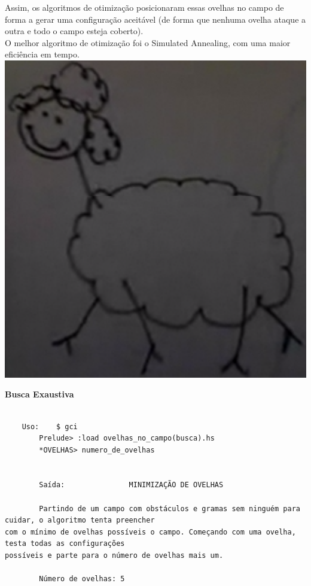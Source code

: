 \documentclass[10pt]{article}
\begin{document}
Assim, os algoritmos de otimização posicionaram essas ovelhas no campo de forma a gerar uma configuração aceitável (de forma que nenhuma ovelha ataque a outra e todo o campo esteja coberto). \\

O melhor algoritmo de otimização foi o Simulated Annealing, com uma maior eficiência em tempo. \\

\vspace{20mm}
\centering
\includegraphics[scale = .5]{ovelha.png}

\pagebreak

\textbf{Busca Exaustiva}
\begin{verbatim}

	Uso:	$ gci
		Prelude> :load ovelhas_no_campo(busca).hs
		*OVELHAS> numero_de_ovelhas

 
        Saída:			     MINIMIZAÇÃO DE OVELHAS

		Partindo de um campo com obstáculos e gramas sem ninguém para cuidar, o algoritmo tenta preencher
com o mínimo de ovelhas possíveis o campo. Começando com uma ovelha, testa todas as configurações 
possíveis e parte para o número de ovelhas mais um.

		Número de ovelhas: 5

\end{verbatim}
\end{document}
